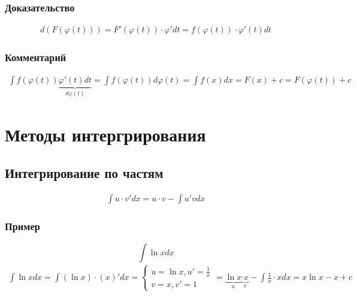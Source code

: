 \documentclass{article}
\begin{document}
\subsubsection{Доказательство}
\begin{gather*}
    d(F(\varphi(t))) = F'(\varphi(t)) \cdot \varphi' dt = f(\varphi(t)) \cdot \varphi'(t) dt
\end{gather*}

\subsubsection{Комментарий}
\begin{gather*}
    \int f(\varphi(t)) \underbrace{\varphi'(t) dt}_{d\varphi(t)} = \int f(\varphi(t)) d\varphi(t) = 
    \int f(x) dx = F(x) + c = F(\varphi(t)) + c
\end{gather*}



\section{Методы интергрирования}

\subsection{Интегрирование по частям}
\begin{gather*}
    \int u \cdot v' dx = u \cdot v - \int u' v dx
\end{gather*}

\subsubsection{Пример}
\[
    \int \ln x dx
\]
\begin{gather*}
    \int \ln x dx = \int (\ln x) \cdot (x)' dx = \begin{cases}
        u = \ln x, u' = \frac{1}{x} \\
        v = x, v' = 1
    \end{cases} = \underbrace{\ln x}_{u} \underbrace{\cdot x}_{v} - \int \frac{1}{x} \cdot x dx = x \ln x - x + c
\end{gather*}
\end{document}
